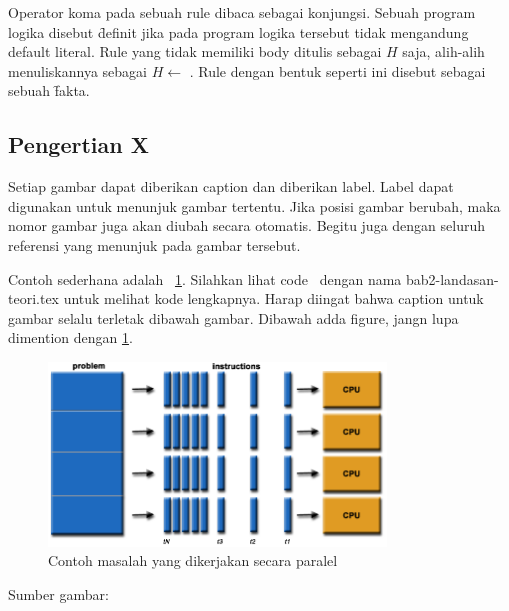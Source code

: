Operator koma pada sebuah rule dibaca sebagai konjungsi. Sebuah program logika disebut \f{definit} jika pada program logika tersebut tidak mengandung default literal. Rule yang tidak memiliki body ditulis sebagai $H$ saja, alih-alih menuliskannya sebagai $H \leftarrow $ . Rule dengan bentuk seperti ini disebut sebagai sebuah \f{fakta}.
\subsection{Pengertian X}
Setiap gambar dapat diberikan caption dan diberikan label. Label dapat digunakan untuk menunjuk gambar tertentu. Jika posisi gambar berubah, maka nomor gambar juga akan diubah secara 
otomatis. Begitu juga dengan seluruh referensi yang menunjuk pada gambar tersebut.

Contoh sederhana adalah \pic~\ref{fig:exmasalahparalel}. Silahkan lihat code \latex~dengan nama bab2-landasan-teori.tex untuk melihat kode lengkapnya. Harap diingat bahwa caption untuk gambar selalu terletak dibawah gambar.
Dibawah adda figure, jangn lupa dimention dengan \ref{fig:exmasalahparalel}. 

\begin{figure}
	\centering
	\includegraphics[width=0.8\textwidth]
		{pics/parallelProblem.png}
	\caption{Contoh masalah yang dikerjakan secara paralel}
	\label{fig:exmasalahparalel}
\end{figure}
\vspace{-0.8cm}
\begin{center}
{\small Sumber gambar: \citep{net.oxford}}
\end{center}

